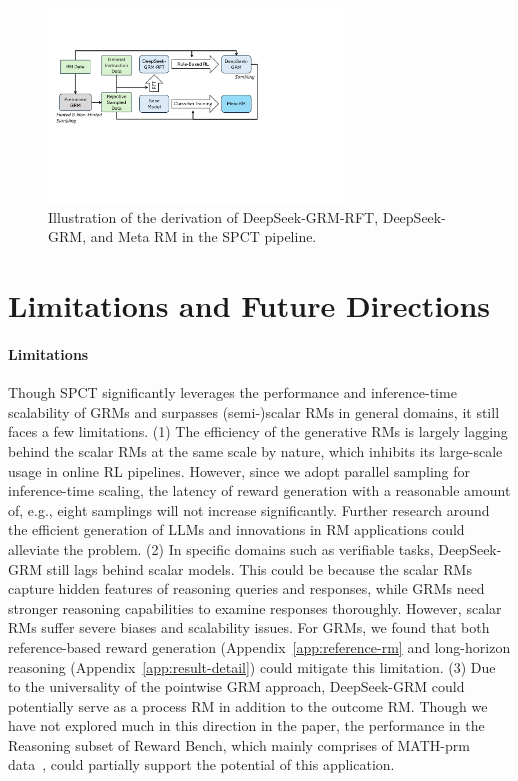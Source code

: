 \documentclass{article} %
\newcommand{\SGRMAll}{DeepSeek-GRM\xspace}
\begin{document}
\begin{figure}[t]
  \centering
  \includegraphics[width=0.7\textwidth]{figures/fig4-preprint.pdf}
  \caption{Illustration of the derivation of \SGRMAll-RFT, \SGRMAll, and Meta RM in the SPCT pipeline.}
  \label{fig:pipeline}
  \vspace{-1em}
\end{figure}

\section{Limitations and Future Directions}\label{app:limit}

\paragraph{Limitations}
Though SPCT significantly leverages the performance and inference-time scalability of GRMs and surpasses (semi-)scalar RMs in general domains, it still faces a few limitations. 
(1) The efficiency of the generative RMs is largely lagging behind the scalar RMs at the same scale by nature, which inhibits its large-scale usage in online RL pipelines. However, since we adopt parallel sampling for inference-time scaling, the latency of reward generation with a reasonable amount of, e.g., eight samplings will not increase significantly. Further research around the efficient generation of LLMs and innovations in RM applications could alleviate the problem. (2) 
In specific domains such as verifiable tasks, \SGRMAll still lags behind scalar models. This could be because the scalar RMs capture hidden features of reasoning queries and responses, while GRMs need stronger reasoning capabilities to examine responses thoroughly. However, scalar RMs suffer severe biases and scalability issues. For GRMs, we found that both reference-based reward generation (Appendix~\ref{app:reference-rm} and long-horizon reasoning (Appendix~\ref{app:result-detail}) could mitigate this limitation. (3) Due to the universality of the pointwise GRM approach, \SGRMAll could potentially serve as a process RM in addition to the outcome RM. Though we have not explored much in this direction in the paper, the performance in the Reasoning subset of Reward Bench, which mainly comprises of MATH-prm data~\citep{lightman2024lets}, could partially support the potential of this application. 
\end{document}
